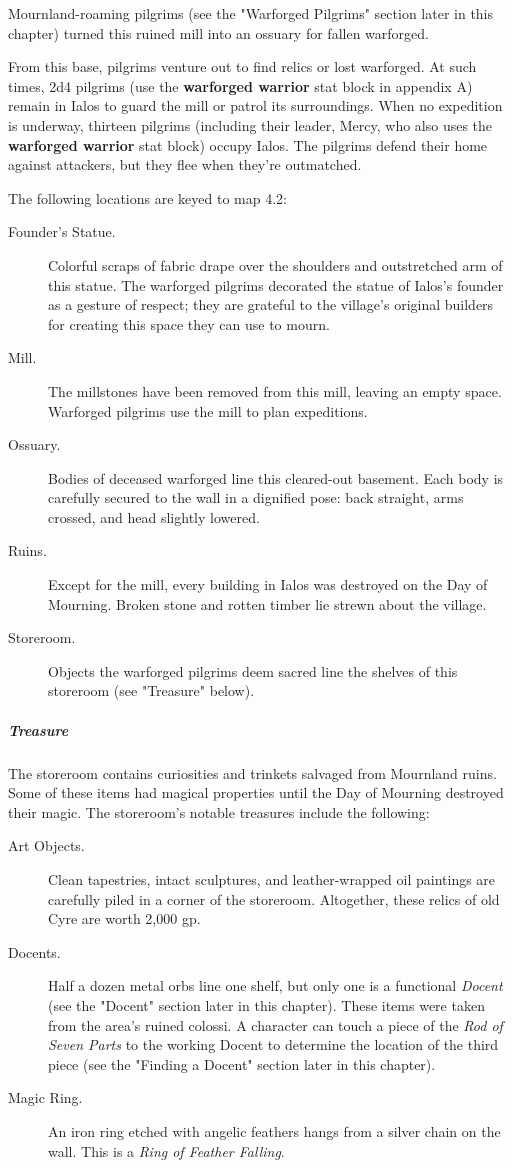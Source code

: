 \documentclass[10pt,a4paper,twoside,bg=print,twocolumn,openany,nodeprecatedcode]{dndbook}
\begin{document}
Mournland-roaming pilgrims (see the "Warforged Pilgrims" section later in this chapter) turned this ruined mill into an ossuary for fallen warforged.

From this base, pilgrims venture out to find relics or lost warforged. At such times, 2d4 pilgrims (use the \textbf{warforged warrior} stat block in appendix A) remain in Ialos to guard the mill or patrol its surroundings. When no expedition is underway, thirteen pilgrims (including their leader, Mercy, who also uses the \textbf{warforged warrior} stat block) occupy Ialos. The pilgrims defend their home against attackers, but they flee when they're outmatched.

The following locations are keyed to map 4.2:


\begin{description}
\item[Founder's Statue.]
Colorful scraps of fabric drape over the shoulders and outstretched arm of this statue. The warforged pilgrims decorated the statue of Ialos's founder as a gesture of respect; they are grateful to the village's original builders for creating this space they can use to mourn.
\item[Mill.]
The millstones have been removed from this mill, leaving an empty space. Warforged pilgrims use the mill to plan expeditions.
\item[Ossuary.]
Bodies of deceased warforged line this cleared-out basement. Each body is carefully secured to the wall in a dignified pose: back straight, arms crossed, and head slightly lowered.
\item[Ruins.]
Except for the mill, every building in Ialos was destroyed on the Day of Mourning. Broken stone and rotten timber lie strewn about the village.
\item[Storeroom.]
Objects the warforged pilgrims deem sacred line the shelves of this storeroom (see "Treasure" below).
\end{description}

\subparagraph{Treasure}
The storeroom contains curiosities and trinkets salvaged from Mournland ruins. Some of these items had magical properties until the Day of Mourning destroyed their magic. The storeroom's notable treasures include the following:


\begin{description}
\item[Art Objects.]
Clean tapestries, intact sculptures, and leather-wrapped oil paintings are carefully piled in a corner of the storeroom. Altogether, these relics of old Cyre are worth 2,000 gp.
\item[Docents.]
Half a dozen metal orbs line one shelf, but only one is a functional \textit{Docent} (see the "Docent" section later in this chapter). These items were taken from the area's ruined colossi. A character can touch a piece of the \textit{Rod of Seven Parts} to the working Docent to determine the location of the third piece (see the "Finding a Docent" section later in this chapter).
\item[Magic Ring.]
An iron ring etched with angelic feathers hangs from a silver chain on the wall. This is a \textit{Ring of Feather Falling}.
\end{description}
\end{document}
